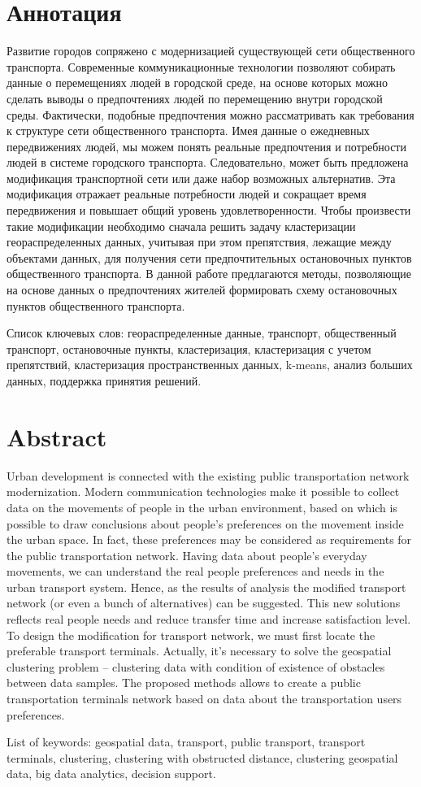 \tocless\part{Аннотация}
Развитие городов сопряжено с модернизацией существующей сети общественного транспорта. Современные коммуникационные технологии позволяют собирать данные о перемещениях людей в городской среде, на основе которых можно сделать выводы о предпочтениях людей по перемещению внутри городской среды. Фактически, подобные предпочтения можно рассматривать как требования к структуре сети общественного транспорта. Имея данные о ежедневных передвижениях людей, мы можем понять реальные предпочтения и потребности людей в системе городского транспорта. Следовательно, может быть предложена модификация транспортной сети или даже набор возможных альтернатив. Эта модификация отражает реальные потребности людей и сокращает время передвижения и повышает общий уровень удовлетворенности. Чтобы произвести такие модификации необходимо сначала решить задачу кластеризации геораспределенных данных, учитывая при этом препятствия, лежащие между объектами данных, для получения сети предпочтительных остановочных пунктов общественного транспорта. В данной работе предлагаются методы, позволяющие на основе данных о предпочтениях жителей формировать схему остановочных пунктов общественного транспорта.

Список ключевых слов: геораспределенные данные, транспорт, общественный транспорт, остановочные пункты, кластеризация, кластеризация с учетом препятствий, кластеризация пространственных данных, k-means, анализ больших данных, поддержка принятия решений.

\tocless\part{Abstract}
Urban development is connected with the existing public transportation network modernization. Modern communication technologies make it possible to collect data on the movements of people in the urban environment, based on which is possible to draw conclusions about people's preferences on the movement inside the urban space. In fact, these preferences may be considered as requirements for the public transportation network. Having data about people's everyday movements, we can understand the real people preferences and needs in the urban transport system. Hence, as the results of analysis the modified transport network (or even a bunch of alternatives) can be suggested. This new solutions reflects real people needs and reduce transfer time and increase satisfaction level. To design the modification for transport network, we must first locate the preferable transport terminals. Actually, it's necessary to solve the geospatial clustering problem -- clustering data with condition of existence of obstacles between data samples.
The proposed methods allows to create a public transportation terminals network based on data about the transportation users preferences.

List of keywords: geospatial data, transport, public transport, transport terminals, clustering, clustering with obstructed distance, clustering geospatial data, big data analytics, decision support.